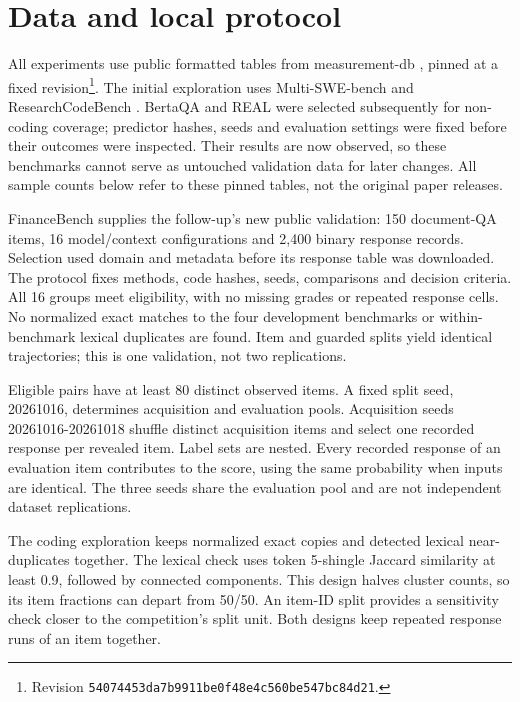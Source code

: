 \documentclass{article}
\begin{document}
\section{Data and local protocol}\label{data-and-local-protocol}

All experiments use public formatted tables from measurement-db \cite{ref3}, pinned at a fixed revision\footnote{Revision \texttt{54074453da7b9911be0f48e4c560be547bc84d21}.}. The initial exploration uses Multi-SWE-bench \cite{ref5} and ResearchCodeBench \cite{ref6}. BertaQA \cite{ref7} and REAL \cite{ref8} were selected subsequently for non-coding coverage; predictor hashes, seeds and evaluation settings were fixed before their outcomes were inspected. Their results are now observed, so these benchmarks cannot serve as untouched validation data for later changes. All sample counts below refer to these pinned tables, not the original paper releases.

FinanceBench \cite{ref9} supplies the follow-up's new public validation: 150 document-QA items, 16 model/context configurations and 2,400 binary response records. Selection used domain and metadata before its response table was downloaded. The protocol fixes methods, code hashes, seeds, comparisons and decision criteria. All 16 groups meet eligibility, with no missing grades or repeated response cells. No normalized exact matches to the four development benchmarks or within-benchmark lexical duplicates are found. Item and guarded splits yield identical trajectories; this is one validation, not two replications.

Eligible pairs have at least 80 distinct observed items. A fixed split seed, 20261016, determines acquisition and evaluation pools. Acquisition seeds 20261016-20261018 shuffle distinct acquisition items and select one recorded response per revealed item. Label sets are nested. Every recorded response of an evaluation item contributes to the score, using the same probability when inputs are identical. The three seeds share the evaluation pool and are not independent dataset replications.

The coding exploration keeps normalized exact copies and detected lexical near-duplicates together. The lexical check uses token 5-shingle Jaccard similarity at least 0.9, followed by connected components. This design halves cluster counts, so its item fractions can depart from 50/50. An item-ID split provides a sensitivity check closer to the competition's split unit. Both designs keep repeated response runs of an item together.
\end{document}
